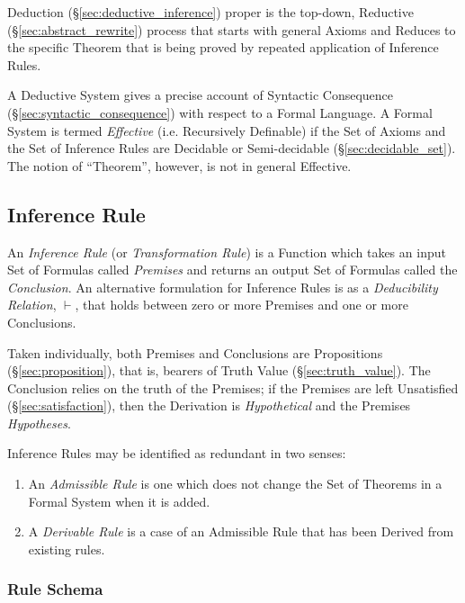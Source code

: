 Deduction (\S\ref{sec:deductive_inference}) proper is the top-down,
Reductive (\S\ref{sec:abstract_rewrite}) process that starts with
general Axioms and Reduces to the specific Theorem that is being
proved by repeated application of Inference Rules.

A Deductive System gives a precise account of Syntactic Consequence
(\S\ref{sec:syntactic_consequence}) with respect to a Formal Language.
A Formal System is termed \emph{Effective} (i.e. Recursively
Definable) if the Set of Axioms and the Set of Inference Rules are
Decidable or Semi-decidable (\S\ref{sec:decidable_set}). The notion of
``Theorem'', however, is not in general Effective.



\subsection{Inference Rule} \label{sec:inference_rule}

An \emph{Inference Rule} (or \emph{Transformation Rule}) is a Function
which takes an input Set of Formulas called \emph{Premises} and returns an
output Set of Formulas called the \emph{Conclusion}. An alternative
formulation for Inference Rules is as a \emph{Deducibility Relation},
$\vdash$, that holds between zero or more Premises and one or more
Conclusions.

Taken individually, both Premises and Conclusions are Propositions
(\S\ref{sec:proposition}), that is, bearers of Truth Value
(\S\ref{sec:truth_value}). The Conclusion relies on the truth of the
Premises; if the Premises are left Unsatisfied
(\S\ref{sec:satisfaction}), then the Derivation is \emph{Hypothetical}
and the Premises \emph{Hypotheses}.

Inference Rules may be identified as redundant in two senses:
\begin{enumerate}
\item An \emph{Admissible Rule} is one which does not change the Set
  of Theorems in a Formal System when it is added.
\item A \emph{Derivable Rule} is a case of an Admissible Rule that has
  been Derived from existing rules.
\end{enumerate}



\subsubsection{Rule Schema}\label{sec:rule_schema}




